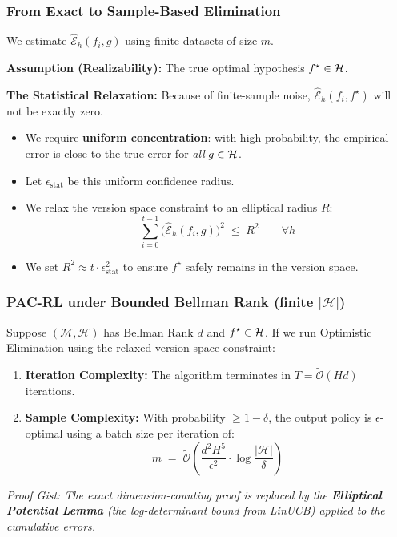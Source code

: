 \documentclass[aspectratio=169]{beamer}
\begin{document}
\begin{frame}\frametitle{From Exact to Sample-Based Elimination}

We estimate $\widehat{\mathcal{E}}_h(f_i, g)$ using finite datasets of size $m$. 

\vspace{0.2cm}
\textbf{Assumption (Realizability):} The true optimal hypothesis $f^\star \in \mathcal{H}$.

\pause
\vspace{0.2cm}
\textbf{The Statistical Relaxation:}
Because of finite-sample noise, $\widehat{\mathcal{E}}_h(f_i, f^\star)$ will not be exactly zero.
\begin{itemize}
    \item We require \textbf{uniform concentration}: with high probability, the empirical error is close to the true error for \emph{all} $g \in \mathcal{H}$.
    \item Let $\epsilon_{\text{stat}}$ be this uniform confidence radius.
    \item We relax the version space constraint to an elliptical radius $R$:
    \[
    \sum_{i=0}^{t-1} \Big( \widehat{\mathcal{E}}_h(f_i, g) \Big)^2 \;\le\; R^2 \qquad \forall h
    \]
    
    \item We set $R^2 \approx t \cdot \epsilon_{\text{stat}}^2$ to ensure $f^\star$ safely remains in the version space.
\end{itemize}

\end{frame}

\begin{frame}\frametitle{PAC-RL under Bounded Bellman Rank (finite $|\mathcal{H}|$)}

\begin{theorem}
Suppose $(\mathcal{M}, \mathcal{H})$ has Bellman Rank $d$ and $f^\star \in \mathcal{H}$. If we run Optimistic Elimination using the relaxed version space constraint:
\begin{enumerate}
    \item \textbf{Iteration Complexity:} The algorithm terminates in $T = \widetilde{\mathcal{O}}(H d)$ iterations.
    \item \textbf{Sample Complexity:} With probability $\ge 1-\delta$, the output policy is $\epsilon$-optimal using a batch size per iteration of:
    \[
    m \;=\; \widetilde{\mathcal{O}}\left( \frac{d^2 H^5}{\epsilon^2} \cdot \log\frac{|\mathcal{H}|}{\delta} \right)
    \]
\end{enumerate}
\end{theorem}

\pause
\vspace{0.4cm}
\textit{Proof Gist: The exact dimension-counting proof is replaced by the \textbf{Elliptical Potential Lemma} (the log-determinant bound from LinUCB) applied to the cumulative errors.}
\end{frame}
\end{document}
